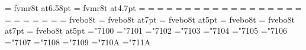 \def\eighttt{\font\fzzozznzzt=      fvmr8t at7.52pt \fzzozznzzt}%
\font\seventt=      fvmr8t at6.58pt
\def\sixtt{\font\fzzozznzzt=        fvmr8t at5.64pt \fzzozznzzt}%
\font\fivett=       fvmr8t at4.7pt
%
=\tenrm
{}=\sevenrm
{}=\fiverm
\def\rm{\fam=0 \tenrm}%
%
=\eleveni
{}=\eighti
{}=\sixi
\def\mit{\fam=1}%
%
=\elevensy
{}=\eightsy
{}=\sixsy
\def\cal{\fam=2}%
%
=\elevenex
{}=\eightex
{}=\sixex
%
\def\it{\fam=\itfam \tenit}%
\textfont\itfam=\tenit
\scriptfont\itfam=\sevenit
\scriptscriptfont\itfam=\fiveit
%
\def\sl{\fam=\slfam \tensl}%
\textfont\slfam=\tensl
\scriptfont\slfam=\sevensl
\scriptscriptfont\slfam=\fivesl
%
\def\bf{\fam=\bffam \tenbf}%
\textfont\bffam=\tenbf
\scriptfont\bffam=\sevenbf
\scriptscriptfont\bffam=\fivebf
%
\def\tt{\fam=\ttfam \tentt}%
\textfont\ttfam=\tentt
\scriptfont\ttfam=\seventt
\scriptscriptfont\ttfam=\fivett
%
\def\twentyitbf{\font\fzzozznzzt=   fvebo8t at20pt \fzzozznzzt}%
\def\eighteenitbf{\font\fzzozznzzt= fvebo8t at18pt \fzzozznzzt}%
\def\sixteenitbf{\font\fzzozznzzt=  fvebo8t at16pt \fzzozznzzt}%
\def\fourteenitbf{\font\fzzozznzzt=    fvebo8t at14pt \fzzozznzzt}%
\def\twelveitbf{\font\fzzozznzzt=   fvebo8t at12pt \fzzozznzzt}%
\font\itbf=            fvebo8t
\def\nineitbf{\font\fzzozznzzt=        fvebo8t at9pt \fzzozznzzt}%
\def\eightitbf{\font\fzzozznzzt=       fvebo8t at8pt \fzzozznzzt}%
\font\sevenitbf=       fvebo8t at7pt
\def\sixitbf{\font\fzzozznzzt=         fvebo8t at6pt \fzzozznzzt}%
\font\fiveitbf=        fvebo8t at5pt
%
\def\twentyslbf{\font\fzzozznzzt=   fvebo8t at20pt \fzzozznzzt}%
\def\eighteenslbf{\font\fzzozznzzt= fvebo8t at18pt \fzzozznzzt}%
\def\sixteenslbf{\font\fzzozznzzt=  fvebo8t at16pt \fzzozznzzt}%
\def\fourteenslbf{\font\fzzozznzzt=    fvebo8t at14pt \fzzozznzzt}%
\def\twelveslbf{\font\fzzozznzzt=   fvebo8t at12pt \fzzozznzzt}%
\font\slbf=            fvebo8t
\def\nineslbf{\font\fzzozznzzt=        fvebo8t at9pt \fzzozznzzt}%
\def\eightslbf{\font\fzzozznzzt=       fvebo8t at8pt \fzzozznzzt}%
\font\sevenslbf=       fvebo8t at7pt
\def\sixslbf{\font\fzzozznzzt=         fvebo8t at6pt \fzzozznzzt}%
\font\fiveslbf=        fvebo8t at5pt
%
%
%
\mathchardef\Gamma="7100
\mathchardef\Delta="7101
\mathchardef\Theta="7102
\mathchardef\Lambda="7103
\mathchardef\Xi="7104
\mathchardef\Pi="7105
\mathchardef\Sigma="7106
\mathchardef\Upsilon="7107
%
\mathchardef\Phi="7108
\mathchardef\Psi="7109
\mathchardef\Omega="710A
%
\mathchardef\varrho="711A
%
\rm 